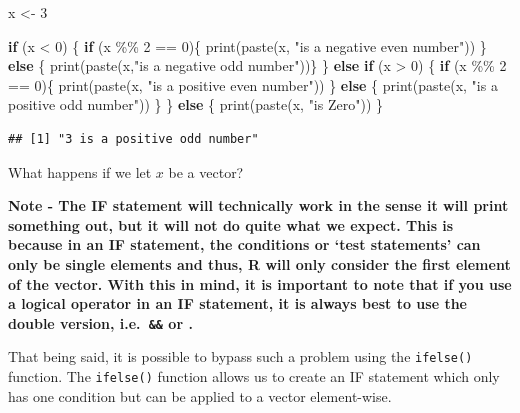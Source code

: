 \documentclass[
]{book}
\newenvironment{Shaded}{\begin{snugshade}}{\end{snugshade}}
\newcommand{\ControlFlowTok}[1]{\textcolor[rgb]{0.13,0.29,0.53}{\textbf{#1}}}
\newcommand{\DecValTok}[1]{\textcolor[rgb]{0.00,0.00,0.81}{#1}}
\newcommand{\FunctionTok}[1]{\textcolor[rgb]{0.00,0.00,0.00}{#1}}
\newcommand{\NormalTok}[1]{#1}
\newcommand{\OtherTok}[1]{\textcolor[rgb]{0.56,0.35,0.01}{#1}}
\newcommand{\SpecialCharTok}[1]{\textcolor[rgb]{0.00,0.00,0.00}{#1}}
\newcommand{\StringTok}[1]{\textcolor[rgb]{0.31,0.60,0.02}{#1}}
\theoremstyle{definition}
\theoremstyle{definition}
\theoremstyle{definition}
\theoremstyle{definition}
\theoremstyle{remark}
\begin{document}
\begin{Shaded}
\begin{Highlighting}[]
\NormalTok{x }\OtherTok{\textless{}{-}} \DecValTok{3}

\ControlFlowTok{if}\NormalTok{ (x }\SpecialCharTok{\textless{}} \DecValTok{0}\NormalTok{) \{}
  \ControlFlowTok{if}\NormalTok{ (x }\SpecialCharTok{\%\%} \DecValTok{2} \SpecialCharTok{==} \DecValTok{0}\NormalTok{)\{}
  \FunctionTok{print}\NormalTok{(}\FunctionTok{paste}\NormalTok{(x, }\StringTok{"is a negative even number"}\NormalTok{))}
\NormalTok{  \} }\ControlFlowTok{else}\NormalTok{ \{ }
    \FunctionTok{print}\NormalTok{(}\FunctionTok{paste}\NormalTok{(x,}\StringTok{"is a negative odd number"}\NormalTok{))\}}
\NormalTok{\} }\ControlFlowTok{else} \ControlFlowTok{if}\NormalTok{ (x }\SpecialCharTok{\textgreater{}} \DecValTok{0}\NormalTok{) \{}
  \ControlFlowTok{if}\NormalTok{ (x }\SpecialCharTok{\%\%} \DecValTok{2} \SpecialCharTok{==} \DecValTok{0}\NormalTok{)\{}
  \FunctionTok{print}\NormalTok{(}\FunctionTok{paste}\NormalTok{(x, }\StringTok{"is a positive even number"}\NormalTok{))}
\NormalTok{  \} }\ControlFlowTok{else}\NormalTok{ \{}
    \FunctionTok{print}\NormalTok{(}\FunctionTok{paste}\NormalTok{(x, }\StringTok{"is a positive odd number"}\NormalTok{))}
\NormalTok{  \}}
\NormalTok{\} }\ControlFlowTok{else}\NormalTok{ \{}
  \FunctionTok{print}\NormalTok{(}\FunctionTok{paste}\NormalTok{(x, }\StringTok{"is Zero"}\NormalTok{))}
\NormalTok{\}}
\end{Highlighting}
\end{Shaded}

\begin{verbatim}
## [1] "3 is a positive odd number"
\end{verbatim}

What happens if we let \(x\) be a vector?

\textbf{Note - The IF statement will technically work in the sense it will print something out, but it will not do quite what we expect. This is because in an IF statement, the conditions or `test statements' can only be single elements and thus, R will only consider the first element of the vector. With this in mind, it is important to note that if you use a logical operator in an IF statement, it is always best to use the double version, i.e.~\texttt{\&\&} or \texttt{\textbar{}\textbar{}}.}

That being said, it is possible to bypass such a problem using the \texttt{ifelse()} function. The \texttt{ifelse()} function allows us to create an IF statement which only has one condition but can be applied to a vector element-wise.
\end{document}
